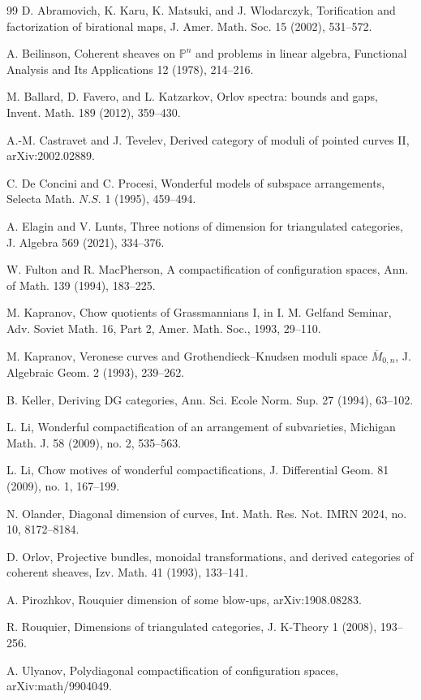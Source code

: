 \documentclass[11pt]{amsart}
\theoremstyle{definition}
\begin{document}
\begin{thebibliography}{99}
D. Abramovich, K. Karu, K. Matsuki, and J. Wlodarczyk, Torification and factorization of birational maps, J. Amer. Math. Soc. 15 (2002), 531--572.

A. Beilinson, Coherent sheaves on $\mathbb P^n$ and problems in linear algebra, Functional Analysis and Its Applications 12 (1978), 214--216.

M. Ballard, D. Favero, and L. Katzarkov, Orlov spectra: bounds and gaps, Invent. Math. 189 (2012), 359--430.

A.-M. Castravet and J. Tevelev, Derived category of moduli of pointed curves II, arXiv:2002.02889.

C. De Concini and C. Procesi, Wonderful models of subspace arrangements, Selecta Math. $N.S.$ 1 (1995), 459--494.

A. Elagin and V. Lunts, Three notions of dimension for triangulated categories, J. Algebra 569 (2021), 334--376.

W. Fulton and R. MacPherson, A compactification of configuration spaces, Ann. of Math. 139 (1994), 183--225.

M. Kapranov, Chow quotients of Grassmannians I, in I. M. Gelfand Seminar, Adv. Soviet Math. 16, Part 2, Amer. Math. Soc., 1993, 29--110.

M. Kapranov, Veronese curves and Grothendieck--Knudsen moduli space $\overline M_{0,n}$, J. Algebraic Geom. 2 (1993), 239--262.

B. Keller, Deriving DG categories, Ann. Sci. Ecole Norm. Sup. 27 (1994), 63--102.

L. Li, Wonderful compactification of an arrangement of subvarieties, Michigan Math. J. 58 (2009), no. 2, 535--563.

L. Li, Chow motives of wonderful compactifications, J. Differential Geom. 81 (2009), no. 1, 167--199.

N. Olander, Diagonal dimension of curves, Int. Math. Res. Not. IMRN 2024, no. 10, 8172--8184.

D. Orlov, Projective bundles, monoidal transformations, and derived categories of coherent sheaves, Izv. Math. 41 (1993), 133--141.

A. Pirozhkov, Rouquier dimension of some blow-ups, arXiv:1908.08283.

R. Rouquier, Dimensions of triangulated categories, J. K-Theory 1 (2008), 193--256.

A. Ulyanov, Polydiagonal compactification of configuration spaces, arXiv:math/9904049.
\end{thebibliography}
\end{document}
